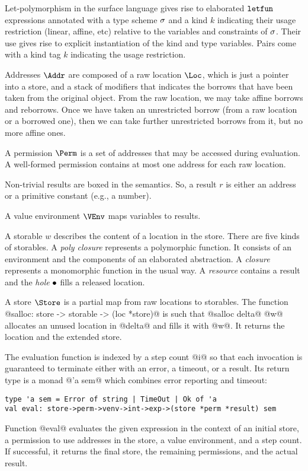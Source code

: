 Let-polymorphism in the surface language gives rise to elaborated
$\mathtt{letfun}$ expressions annotated with a type scheme $\sigma$ and a kind $k$ indicating their
usage restriction (linear, affine, etc) relative to the variables and
constraints of $\sigma$. Their use
gives rise to explicit instantiation of the kind and type variables.
Pairs come with a kind tag $k$ indicating the usage restriction.

Addresses $\Addr$ are composed of a raw location $\Loc$, which is just
a pointer into a store, and a stack of modifiers that indicates the
borrows that have been taken from the original object. From the raw
location, we may take affine borrows and reborrows. Once we have
taken an unrestricted borrow (from a raw location or a borrowed one),
then we can take further unrestricted borrows from it, but no more
affine ones.

A permission $\Perm$ is a set of addresses that may be accessed during
evaluation. A well-formed permission contains at most one address for each raw
location.

Non-trivial results are boxed in the  semantics. So, a result
$r$ is either an address or a primitive constant (e.g., a number).

A value environment $\VEnv$  maps variables to results.

A storable $w$ describes the content of a location in the store. There are five
kinds of storables. A \emph{poly closure} represents a polymorphic
function. It consists of an environment and the components of an
elaborated abstraction. A \emph{closure} represents a monomorphic
function in the usual way.
A \emph{resource} contains
a result and the \emph{hole} $\bullet$ fills a released location.

A store $\Store$ is a partial map from raw locations to
storables. The function
@salloc: store -> storable -> (loc *store)@ is such that
@salloc delta@ @w@ allocates an unused location in @delta@ and fills it with
@w@. It returns the location and the extended store.


The evaluation function is indexed by a step count @i@ so that each
invocation is guaranteed to terminate either with an error, a timeout,
or a result. Its return type is a monad
@'a sem@ which combines error reporting and timeout:
\begin{lstlisting}
type 'a sem = Error of string | TimeOut | Ok of 'a
val eval: store->perm->venv->int->exp->(store *perm *result) sem
\end{lstlisting}
Function @eval@ evaluates the given expression in the context of an initial store, a
permission to use addresses in the store, a value environment, and a
step count. If successful, it returns the final store, the remaining
permissions, and the actual result.

